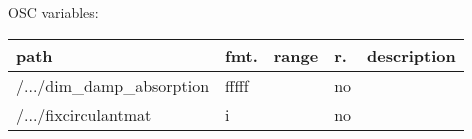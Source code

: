 \begin{snugshade}
{\footnotesize
\label{osctab:receivermodsimplefdn}
OSC variables:
\nopagebreak

\begin{tabularx}{\textwidth}{llllX}
\hline
path & fmt. & range & r. & description\\
\hline
/.../dim\_damp\_absorption & fffff &  & no & \\
/.../fixcirculantmat & i &  & no & \\
\hline
\end{tabularx}
}
\end{snugshade}
